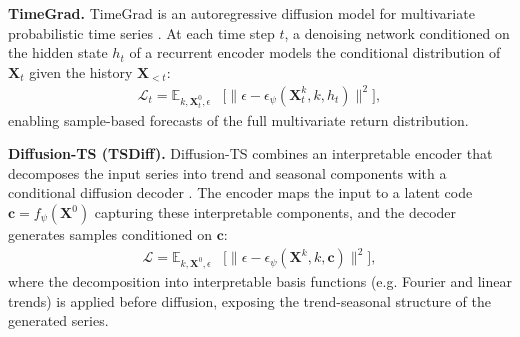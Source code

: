     \begin{enumerate}[label=\textbf{[A\arabic*]},resume]
      \item \label{alg:timegrad} \textbf{TimeGrad.}
      TimeGrad is an autoregressive diffusion model for multivariate
      probabilistic time series \cite{Rasul21}.      At each time step
      \(t\), a denoising network conditioned on the hidden state
      \(h_t\) of a recurrent encoder models the conditional
      distribution of \(\mathbf{X}_t\) given the history
      \(\mathbf{X}_{<t}\):
      \begin{equation}
        \begin{split}
          \mathcal{L}_t = \mathbb{E}_{k, \mathbf{X}^0_t, \epsilon} &
          \Big[\big\|\epsilon - \epsilon_\psi(\mathbf{X}^k_t, k,
          h_t)\big\|^2\Big],
        \end{split}
        \label{eq:timegrad}
      \end{equation}
      enabling sample-based forecasts of the full multivariate return
      distribution.

      \item \label{alg:diffusionts} \textbf{Diffusion-TS (TSDiff).}
      Diffusion-TS combines an interpretable encoder that decomposes
      the input series into trend and seasonal components with a
      conditional diffusion decoder \cite{Yuan24}. The encoder maps
      the input to a latent code \(\mathbf{c} =
      f_\psi(\mathbf{X}^0)\) capturing these interpretable
      components, and the decoder generates samples conditioned on
      \(\mathbf{c}\):
      \begin{equation}
        \begin{split}
          \mathcal{L} = \mathbb{E}_{k, \mathbf{X}^0, \epsilon} &
          \Big[\big\|\epsilon - \epsilon_\psi(\mathbf{X}^k, k,
          \mathbf{c})\big\|^2\Big],
        \end{split}
        \label{eq:diffusionts}
      \end{equation}
      where the decomposition into interpretable basis functions
      (e.g. Fourier and linear trends) is applied before diffusion,
      exposing the trend-seasonal structure of the generated series.
    \end{enumerate}

